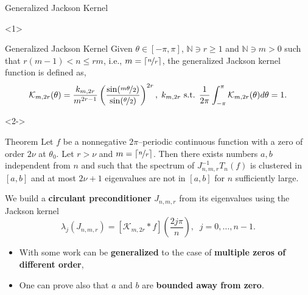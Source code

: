 \documentclass[aspectratio=169,xcolor=dvipsnames]{beamer}
\begin{document}
\begin{frame}{Generalized Jackson Kernel}
	
\begin{onlyenv}<1>
\begin{block}{Generalized Jackson Kernel}
Given $\theta \in [-\pi,\pi]$, $\mathbb{N} \ni r \geq 1$ and
$\mathbb{N} \ni m > 0$ such that $r(m-1) < n \leq rm$, i.e., $m =
\lceil\nicefrac{n}{r}\rceil$, the generalized Jackson kernel
function is defined as,
\begin{equation*}
	\mathcal{K}_{m,2r}(\theta) = \frac{k_{m,2r}}{m^{2r-1}}
	\left(\frac{\sin(\nicefrac{m\theta}{2})}{\sin(\nicefrac{\theta}{2})}\right)^{2r}, \; k_{m,2r} \text{ s.t. }\frac{1}{2\pi}\int_{-\pi}^{\pi}\mathcal{K}_{m,2r}(\theta)d\theta =
	1.
\end{equation*}
\end{block}
\end{onlyenv}

\begin{onlyenv}<2->
	\begin{alertblock}{Theorem \parencite{MR1917364}}
		Let $f$ be a nonnegative $2\pi$--periodic continuous function with a
		zero of order $2\nu$ at $\theta_0$. Let $r > \nu$ and $m =
		\lceil\nicefrac{n}{r}\rceil$. Then there exists numbers
		$a,b$ independent from $n$ and such that the spectrum of
		$J_{n,m,r}^{-1}T_n(f)$ is clustered in $[a,b]$ and at most
		$2\nu+1$ eigenvalues are not in $[a,b]$ for $n$
		sufficiently large.
	\end{alertblock}
\end{onlyenv}
We build a \textbf{circulant preconditioner} $J_{n,m,r}$ from its eigenvalues using the Jackson kernel
\[
\lambda_j(J_{n,m,r}) = [\mathcal{K}_{m,2r}*f]\left(\frac{2j\pi}{n}\right), \;\; j=0,\ldots,n-1.
\]
\begin{itemize}
	\item[\faWrench]<3-> With some work can be \textbf{generalized} to the case of \textbf{multiple zeros of different order},
	\item[\faWrench]<4-> One can prove also that $a$ and $b$ are \textbf{bounded away from zero}. 
\end{itemize}

\end{frame}
\end{document}

